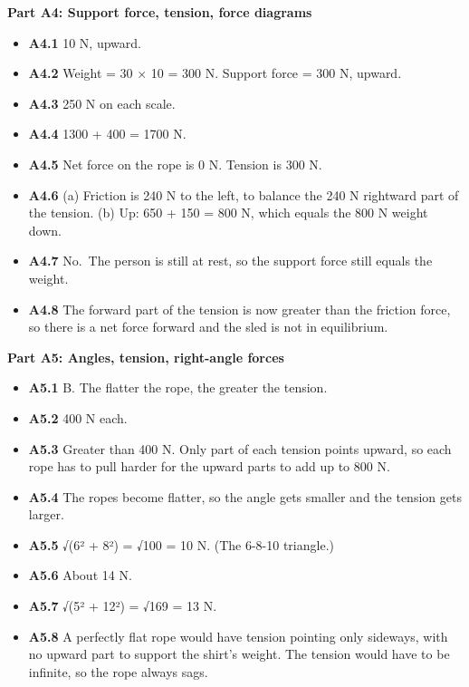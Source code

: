 \documentclass[
]{article}
\providecommand{\tightlist}{%
  \setlength{\itemsep}{0pt}\setlength{\parskip}{0pt}}
\begin{document}
\textbf{Part A4: Support force, tension, force diagrams}

\begin{itemize}
\tightlist
\item
  \textbf{A4.1} 10 N, upward.
\item
  \textbf{A4.2} Weight = 30 × 10 = 300 N. Support force = 300 N, upward.
\item
  \textbf{A4.3} 250 N on each scale.
\item
  \textbf{A4.4} 1300 + 400 = 1700 N.
\item
  \textbf{A4.5} Net force on the rope is 0 N. Tension is 300 N.
\item
  \textbf{A4.6} (a) Friction is 240 N to the left, to balance the 240 N
  rightward part of the tension. (b) Up: 650 + 150 = 800 N, which equals
  the 800 N weight down.
\item
  \textbf{A4.7} No.~The person is still at rest, so the support force
  still equals the weight.
\item
  \textbf{A4.8} The forward part of the tension is now greater than the
  friction force, so there is a net force forward and the sled is not in
  equilibrium.
\end{itemize}

\textbf{Part A5: Angles, tension, right-angle forces}

\begin{itemize}
\tightlist
\item
  \textbf{A5.1} B. The flatter the rope, the greater the tension.
\item
  \textbf{A5.2} 400 N each.
\item
  \textbf{A5.3} Greater than 400 N. Only part of each tension points
  upward, so each rope has to pull harder for the upward parts to add up
  to 800 N.
\item
  \textbf{A5.4} The ropes become flatter, so the angle gets smaller and
  the tension gets larger.
\item
  \textbf{A5.5} √(6² + 8²) = √100 = 10 N. (The 6-8-10 triangle.)
\item
  \textbf{A5.6} About 14 N.
\item
  \textbf{A5.7} √(5² + 12²) = √169 = 13 N.
\item
  \textbf{A5.8} A perfectly flat rope would have tension pointing only
  sideways, with no upward part to support the shirt's weight. The
  tension would have to be infinite, so the rope always sags.
\end{itemize}
\end{document}
